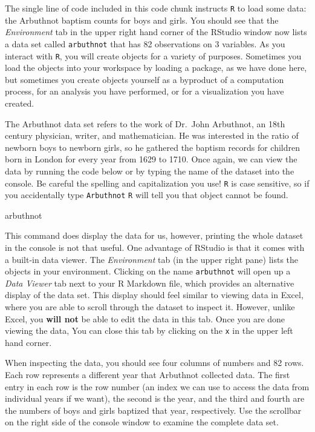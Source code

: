 \documentclass[
]{article}
\newenvironment{Shaded}{\begin{snugshade}}{\end{snugshade}}
\newcommand{\NormalTok}[1]{#1}
\begin{document}
The single line of code included in this code chunk instructs \texttt{R} to load some data: the Arbuthnot baptism counts for boys and girls. You should see that the \emph{Environment} tab in the upper right hand corner of the RStudio window now lists a data set called \texttt{arbuthnot} that has 82 observations on 3 variables. As you interact with \texttt{R}, you will create objects for a variety of purposes. Sometimes you load the objects into your workspace by loading a package, as we have done here, but sometimes you create objects yourself as a byproduct of a computation process, for an analysis you have performed, or for a visualization you have created.

The Arbuthnot data set refers to the work of Dr.~John Arbuthnot, an 18th century physician, writer, and mathematician. He was interested in the ratio of newborn boys to newborn girls, so he gathered the baptism records for children born in London for every year from 1629 to 1710. Once again, we can view the data by running the code below or by typing the name of the dataset into the console. Be careful the spelling and capitalization you use! \texttt{R} is case sensitive, so if you accidentally type \texttt{Arbuthnot} \texttt{R} will tell you that object cannot be found.

\begin{Shaded}
\begin{Highlighting}[]
\NormalTok{arbuthnot}
\end{Highlighting}
\end{Shaded}

This command does display the data for us, however, printing the whole dataset in the console is not that useful. One advantage of RStudio is that it comes with a built-in data viewer. The \emph{Environment} tab (in the upper right pane) lists the objects in your environment. Clicking on the name \texttt{arbuthnot} will open up a \emph{Data Viewer} tab next to your R Markdown file, which provides an alternative display of the data set. This display should feel similar to viewing data in Excel, where you are able to scroll through the dataset to inspect it. However, unlike Excel, you \textbf{will not} be able to edit the data in this tab. Once you are done viewing the data, You can close this tab by clicking on the \texttt{x} in the upper left hand corner.

When inspecting the data, you should see four columns of numbers and 82 rows. Each row represents a different year that Arbuthnot collected data. The first entry in each row is the row number (an index we can use to access the data from individual years if we want), the second is the year, and the third and fourth are the numbers of boys and girls baptized that year, respectively. Use the scrollbar on the right side of the console window to examine the complete data set.
\end{document}
